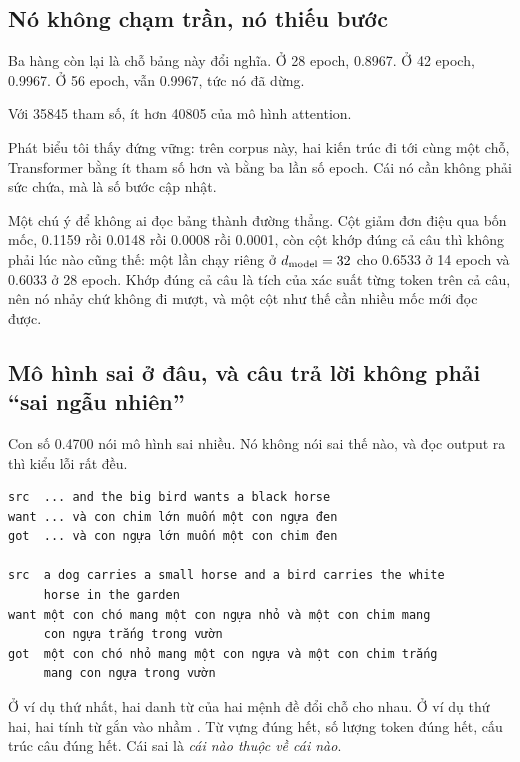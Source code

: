\subsection*{Nó không chạm trần, nó thiếu bước}

%
Ba hàng còn lại là chỗ bảng này đổi nghĩa. Ở 28 epoch, 0.8967. Ở 42 epoch,
0.9967. Ở 56 epoch, vẫn 0.9967, tức nó đã dừng.

Với 35845 tham số, ít hơn 40805 của mô hình attention.

Phát biểu tôi thấy đứng vững: trên corpus này, hai kiến trúc đi tới cùng một
chỗ, Transformer bằng ít tham số hơn và bằng ba lần số epoch. Cái nó cần không
phải sức chứa, mà là số bước cập nhật.

Một chú ý để không ai đọc bảng thành đường thẳng. Cột  giảm đơn điệu
qua bốn mốc, 0.1159 rồi 0.0148 rồi 0.0008 rồi 0.0001, còn cột khớp đúng cả câu
thì không phải lúc nào cũng thế: một lần chạy riêng ở \(d_{\mathrm{model}} = 32\) cho
0.6533 ở 14 epoch và 0.6033 ở 28 epoch. Khớp đúng cả câu là tích của xác suất
từng token trên cả câu, nên nó nhảy chứ không đi mượt, và một cột như thế cần
nhiều mốc mới đọc được.

\subsection*{Mô hình sai ở đâu, và câu trả lời không phải \enquote{sai ngẫu nhiên}}

%
Con số 0.4700 nói mô hình sai nhiều. Nó không nói sai thế nào, và đọc output ra
thì kiểu lỗi rất đều.

\begin{verbatim}
src  ... and the big bird wants a black horse
want ... và con chim lớn muốn một con ngựa đen
got  ... và con ngựa lớn muốn một con chim đen

src  a dog carries a small horse and a bird carries the white
     horse in the garden
want một con chó mang một con ngựa nhỏ và một con chim mang
     con ngựa trắng trong vườn
got  một con chó nhỏ mang một con ngựa và một con chim trắng
     mang con ngựa trong vườn
\end{verbatim}

Ở ví dụ thứ nhất, hai danh từ của hai mệnh đề đổi chỗ cho nhau. Ở ví dụ thứ
hai, hai tính từ gắn vào nhầm . Từ vựng đúng hết,
số lượng token
đúng hết, cấu trúc câu đúng hết. Cái sai là \emph{cái nào thuộc về cái nào}.

